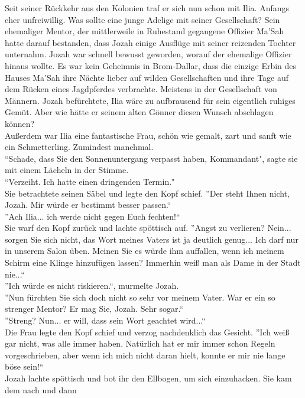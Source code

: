 Seit seiner Rückkehr aus den Kolonien traf er sich nun schon mit Ilia. Anfangs eher unfreiwillig. 
Was sollte eine junge Adelige mit seiner Gesellschaft? Sein ehemaliger Mentor, der mittlerweile in 
Ruhestand gegangene Offizier Ma'Sah hatte darauf bestanden, dass Jozah einige Ausflüge mit seiner 
reizenden Tochter unternahm. Jozah war schnell bewusst geworden, worauf der ehemalige Offizier 
hinaus wollte. Es war kein Geheimnis in Brom-Dallar, dass die einzige Erbin des Hauses Ma'Sah ihre 
Nächte lieber auf wilden Gesellschaften und ihre Tage auf dem Rücken eines Jagdpferdes verbrachte. 
Meistens in der Gesellschaft von Männern. Jozah befürchtete, Ilia wäre zu aufbrausend für sein 
eigentlich ruhiges Gemüt. Aber wie hätte er seinem alten Gönner diesen Wunsch abschlagen können?\\
Außerdem war Ilia eine fantastische Frau, schön wie gemalt, zart und sanft wie ein Schmetterling. 
Zumindest manchmal.\\
 ``Schade, dass Sie den Sonnenuntergang verpasst haben, Kommandant", sagte sie mit einem Lächeln 
in der Stimme.\\
 ``Verzeiht. Ich hatte einen dringenden Termin."\\
Sie betrachtete seinen Säbel und legte den Kopf schief. ''Der steht Ihnen nicht, Jozah. Mir würde 
er bestimmt besser passen.``\\
''Ach Ilia... ich werde nicht gegen Euch fechten!``\\
Sie warf den Kopf zurück und lachte spöttisch auf. ''Angst zu verlieren? Nein... sorgen Sie sich 
nicht, das Wort meines Vaters ist ja deutlich genug... Ich darf nur in unserem Salon üben. Meinen 
Sie es würde ihm auffallen, wenn ich meinem Schirm eine Klinge hinzufügen lassen? Immerhin weiß man 
als Dame in der Stadt nie...``\\
''Ich würde es nicht riskieren.``, murmelte Jozah.\\
''Nun fürchten Sie sich doch nicht so sehr vor meinem Vater. War er ein so strenger Mentor? Er mag 
Sie, Jozah. Sehr sogar.``\\
''Streng? Nun... er will, dass sein Wort geachtet wird...``\\
Die Frau legte den Kopf schief und verzog nachdenklich das Gesicht. ''Ich weiß gar nicht, was alle 
immer haben. Natürlich hat er mir immer schon Regeln vorgeschrieben, aber wenn ich mich nicht daran 
hielt, konnte er mir nie lange böse sein!``\\
Jozah lachte spöttisch und bot ihr den Ellbogen, um sich einzuhacken. Sie kam dem nach und dann 
